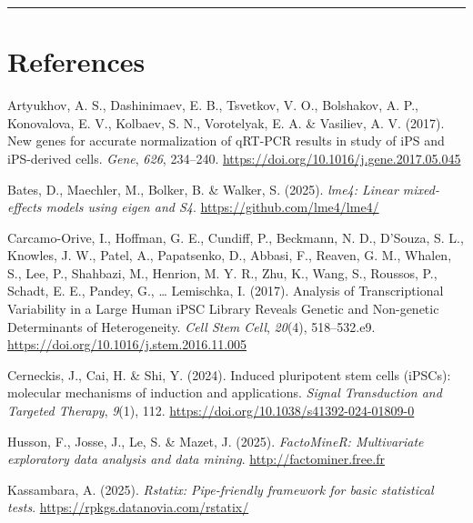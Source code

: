\documentclass[
  letterpaper,
  DIV=11,
  numbers=noendperiod]{scrartcl}
\newlength{\cslhangindent}
\newenvironment{CSLReferences}[2] %
 {\begin{list}{}{%
  \setlength{\itemindent}{0pt}
  \setlength{\leftmargin}{0pt}
  \setlength{\parsep}{0pt}
  \ifodd #1
   \setlength{\leftmargin}{\cslhangindent}
   \setlength{\itemindent}{-1\cslhangindent}
  \fi
  \setlength{\itemsep}{#2\baselineskip}}}
 {\end{list}}
\begin{document}
\begin{center}\rule{0.5\linewidth}{0.5pt}\end{center}

\section*{References}\label{references}

\label{refs}
\begin{CSLReferences}{1}{0}
Artyukhov, A. S., Dashinimaev, E. B., Tsvetkov, V. O., Bolshakov, A. P.,
Konovalova, E. V., Kolbaev, S. N., Vorotelyak, E. A. \& Vasiliev, A. V.
(2017). New genes for accurate normalization of qRT-PCR results in study
of iPS and iPS-derived cells. \emph{Gene}, \emph{626}, 234--240.
\url{https://doi.org/10.1016/j.gene.2017.05.045}

Bates, D., Maechler, M., Bolker, B. \& Walker, S. (2025). \emph{lme4:
Linear mixed-effects models using eigen and S4}.
\url{https://github.com/lme4/lme4/}

Carcamo-Orive, I., Hoffman, G. E., Cundiff, P., Beckmann, N. D.,
D'Souza, S. L., Knowles, J. W., Patel, A., Papatsenko, D., Abbasi, F.,
Reaven, G. M., Whalen, S., Lee, P., Shahbazi, M., Henrion, M. Y. R.,
Zhu, K., Wang, S., Roussos, P., Schadt, E. E., Pandey, G., \ldots{}
Lemischka, I. (2017). Analysis of Transcriptional Variability in a Large
Human iPSC Library Reveals Genetic and Non-genetic Determinants of
Heterogeneity. \emph{Cell Stem Cell}, \emph{20}(4), 518--532.e9.
\url{https://doi.org/10.1016/j.stem.2016.11.005}

Cerneckis, J., Cai, H. \& Shi, Y. (2024). Induced pluripotent stem cells
(iPSCs): molecular mechanisms of induction and applications.
\emph{Signal Transduction and Targeted Therapy}, \emph{9}(1), 112.
\url{https://doi.org/10.1038/s41392-024-01809-0}

Husson, F., Josse, J., Le, S. \& Mazet, J. (2025). \emph{FactoMineR:
Multivariate exploratory data analysis and data mining}.
\url{http://factominer.free.fr}

Kassambara, A. (2025). \emph{Rstatix: Pipe-friendly framework for basic
statistical tests}. \url{https://rpkgs.datanovia.com/rstatix/}


\end{CSLReferences}
\end{document}
